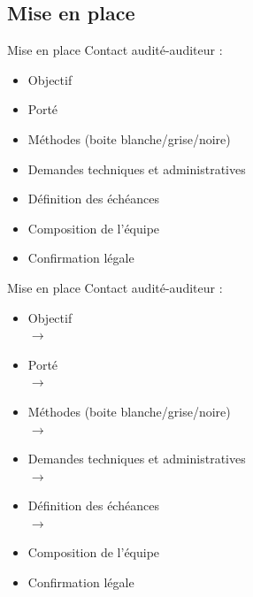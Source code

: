 \documentclass{beamer}
\newcommand{\colorized}[1]{{\color{red}{#1}}}
\begin{document}
\subsection{Mise en place}
\begin{frame}{Mise en place}
	Contact audité-auditeur : 
	\begin{itemize}
		\item Objectif
		\item Porté 
		\item Méthodes (boite blanche/grise/noire) 
		\item Demandes techniques et administratives 
		\item Définition des échéances 
		\item Composition de l'équipe 
		\item Confirmation légale 
	\end{itemize}		
\end{frame}
\begin{frame}{Mise en place}
	Contact audité-auditeur : 
	\begin{itemize}
		\item Objectif \\
		      $\rightarrow$ \colorized{vérifier des vulnérabilités de l'OWASP TOP 10}
		\item Porté \\
		      $\rightarrow$ \colorized{application web DVWA (en local)}
		\item Méthodes (boite blanche/grise/noire) \\
		      $\rightarrow$ \colorized{boite blanche}
		\item Demandes techniques et administratives \\
		      $\rightarrow$ \colorized{code source}
		\item Définition des échéances \\
		      $\rightarrow$ \colorized{\today}
		\item Composition de l'équipe 
		\item Confirmation légale 
	\end{itemize}		
\end{frame}
\end{document}
